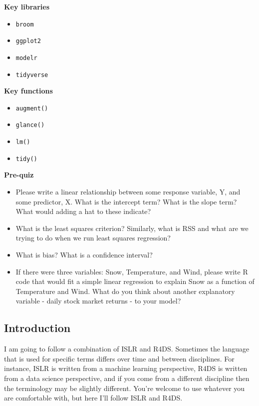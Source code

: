 \documentclass[
]{book}
\providecommand{\tightlist}{%
  \setlength{\itemsep}{0pt}\setlength{\parskip}{0pt}}
\begin{document}
\textbf{Key libraries}

\begin{itemize}
\tightlist
\item
  \texttt{broom}
\item
  \texttt{ggplot2}
\item
  \texttt{modelr}
\item
  \texttt{tidyverse}
\end{itemize}

\textbf{Key functions}

\begin{itemize}
\tightlist
\item
  \texttt{augment()}
\item
  \texttt{glance()}
\item
  \texttt{lm()}
\item
  \texttt{tidy()}
\end{itemize}

\textbf{Pre-quiz}

\begin{itemize}
\tightlist
\item
  Please write a linear relationship between some response variable, Y, and some predictor, X. What is the intercept term? What is the slope term? What would adding a hat to these indicate?
\item
  What is the least squares criterion? Similarly, what is RSS and what are we trying to do when we run least squares regression?
\item
  What is bias? What is a confidence interval?
\item
  If there were three variables: Snow, Temperature, and Wind, please write R code that would fit a simple linear regression to explain Snow as a function of Temperature and Wind. What do you think about another explanatory variable - daily stock market returns - to your model?
\end{itemize}

\hypertarget{introduction-18}{%
\subsection{Introduction}\label{introduction-18}}

I am going to follow a combination of ISLR and R4DS. Sometimes the language that is used for specific terms differs over time and between disciplines. For instance, ISLR is written from a machine learning perspective, R4DS is written from a data science perspective, and if you come from a different discipline then the terminology may be slightly different. You're welcome to use whatever you are comfortable with, but here I'll follow ISLR and R4DS.
\end{document}
